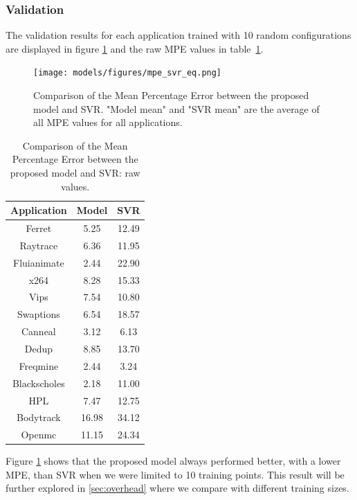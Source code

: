 \subsubsection{Validation}
The validation results for each application trained with 10 random configurations are displayed in figure \ref{fig:mpe_svr_eq} and the raw MPE values in  table~\ref{tab:mpe_svr_eq}.
\begin{figure}[htb!]
	\texttt{[image: models/figures/mpe\_svr\_eq.png]}
	\caption{Comparison of the Mean Percentage Error between the proposed model and SVR. "Model mean" and "SVR mean" are the average of all MPE values for all applications.
	}
	\label{fig:mpe_svr_eq}
\end{figure}
\begin{table}[htb!]
	\centering
	\begin{tabular}{|c|c|c|}
		\hline
		Application  & Model & SVR   \\ \hline
		Ferret       & 5.25     & 12.49  \\ \hline
		Raytrace     & 6.36     & 11.95  \\ \hline
		Fluianimate  & 2.44     & 22.90  \\ \hline
		x264         & 8.28     & 15.33  \\ \hline
		Vips         & 7.54     & 10.80  \\ \hline
		Swaptions    & 6.54     & 18.57  \\ \hline
		Canneal      & 3.12     & 6.13   \\ \hline
		Dedup        & 8.85     & 13.70  \\ \hline
		Freqmine     & 2.44     & 3.24   \\ \hline
		Blackscholes & 2.18     & 11.00  \\ \hline
		HPL          & 7.47     & 12.75  \\ \hline
		Bodytrack    & 16.98    & 34.12  \\ \hline
		Openmc       & 11.15    & 24.34  \\ \hline
	\end{tabular}
	\caption{Comparison of the Mean Percentage Error between the proposed model and SVR: raw values.}
	\label{tab:mpe_svr_eq}
\end{table}

Figure \ref{fig:mpe_svr_eq} shows that the proposed model always performed better, with a lower MPE, than SVR when we were limited to 10 training points. This result will be further explored in \cref{sec:overhead} where we compare with different training sizes.

